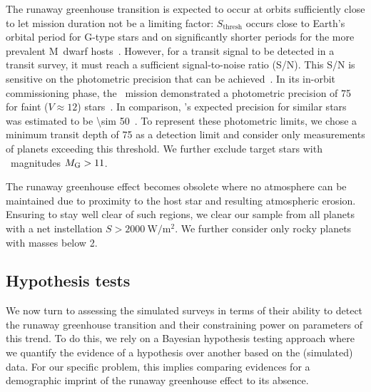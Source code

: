 \documentclass[modern]{aastex631}
\begin{document}
The runaway greenhouse transition is expected to occur at orbits sufficiently close to let mission duration not be a limiting factor: $S_\mathrm{thresh}$ occurs close to Earth's orbital period for \mbox{G-type} stars and on significantly shorter periods for the more prevalent M~dwarf hosts~\citep{Goldblatt2012}.
However, for a transit signal to be detected in a transit survey, it must reach a sufficient signal-to-noise ratio (S/N).
This S/N is sensitive on the photometric precision that can be achieved~\citep[e.g.,][]{Burke2015,Hardegree-Ullman2019}.
In its in-orbit commissioning phase, the \cheops\ mission demonstrated a photometric precision of \SI{75}{\ppm} for faint ($V\approx 12$) stars~\citep{Benz2021}.
In comparison, \plato's expected precision for similar stars was estimated to be \SI{\sim 50}{\ppm}~\citep[][Matuszewski et al., in prep.]{plato2017}.
To represent these photometric limits, we chose a minimum transit depth of \SI{75}{\ppm} as a detection limit and consider only measurements of planets exceeding this threshold.
We further exclude target stars with \gaia\ magnitudes $M_\mathrm{G} > 11$.

The runaway greenhouse effect becomes obsolete where no atmosphere can be maintained due to proximity to the host star and resulting atmospheric erosion.
Ensuring to stay well clear of such regions, we clear our sample from all planets with a net instellation $S > \SI{2000}{\watt\per\square\meter}$.
We further consider only rocky planets with masses below \SI{2}{\Mearth}. %


\subsection{Hypothesis tests}
We now turn to assessing the simulated surveys in terms of their ability to detect the runaway greenhouse transition and their constraining power on parameters of this trend.
To do this, we rely on a Bayesian hypothesis testing approach where we quantify the evidence of a hypothesis over another based on the (simulated) data.
For our specific problem, this implies comparing evidences for a demographic imprint of the runaway greenhouse effect to its absence.
\end{document}
